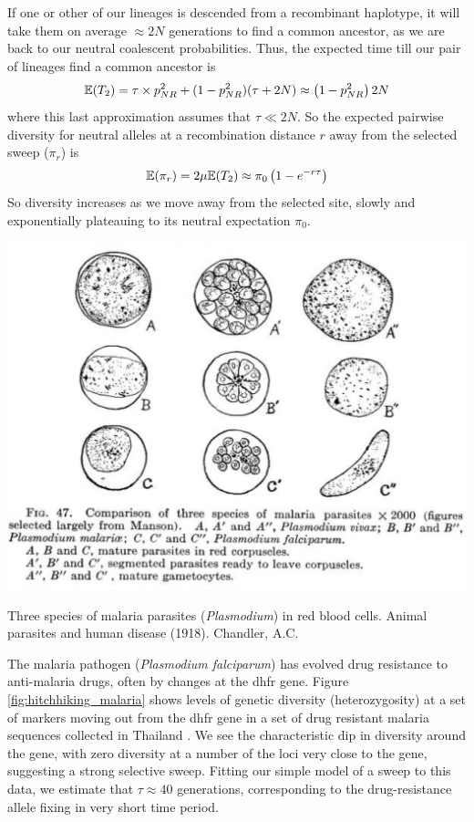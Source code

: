 If one or other of our lineages is descended from a recombinant haplotype, it will take them on average
$\approx 2N$ generations to find a common ancestor, as we are back to our
neutral coalescent probabilities. Thus, the expected time
till our pair of lineages find a common ancestor is
\begin{equation}
\mathbb{E}(T_2)  = \tau \times p_{NR}^2 +(1-p_{NR}^2) (\tau +2N) \approx
\left(1-p_{NR}^2 \right) 2N
\end{equation}
where this last approximation assumes that $\tau \ll 2N$. So the
expected pairwise diversity for neutral alleles at a recombination
distance $r$ away from the selected sweep ($\pi_r$) is
\begin{equation}
\mathbb{E}(\pi_r) = 2\mu \mathbb{E}(T_2)  \approx \pi_0 \left(1-e^{-r\tau} \right) \label{eqn:pi_HH}
\end{equation}
So diversity increases as we move away from the selected site,
slowly and exponentially plateauing to its neutral expectation $\pi_0$.\\
\begin{marginfigure}
\begin{center}
\includegraphics[width=\textwidth]{illustration_images/hitchhiking/malaria/malaria.png}
\end{center}
\caption{Three species of malaria parasites ({\it Plasmodium}) in red
  blood cells. Animal parasites and human disease (1918). Chandler, A.C. } \label{fig:malaria}
\end{marginfigure}
The malaria pathogen ({\it Plasmodium falciparum}) has
evolved drug resistance to anti-malaria drugs, often by changes at
the dhfr gene. Figure \ref{fig:hitchhiking_malaria} shows levels of
genetic diversity (heterozygosity) at a set of markers moving out from the dhfr gene in a
set of  drug resistant malaria sequences collected in
Thailand \citep{nash2005selection}. We see the characteristic dip in diversity around the gene,
with zero diversity at a number of the loci very close to the gene,
suggesting a strong selective sweep. Fitting our simple model of a
sweep to this data,  we estimate that $\tau \approx 40$ generations,
corresponding to the drug-resistance allele fixing in very short time period. 

